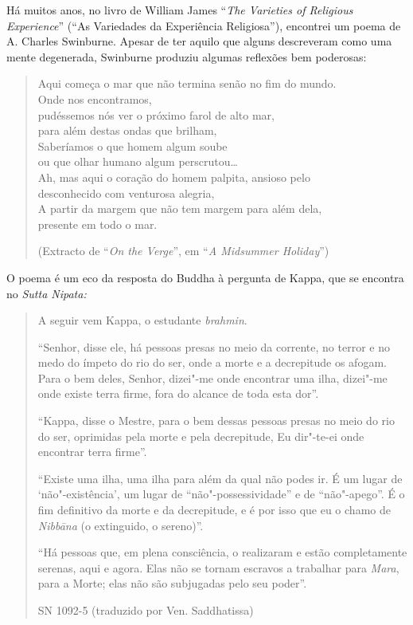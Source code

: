 Há muitos anos, no livro de William James ``\emph{The Varieties of
Religious Experience}'' (``As Variedades da Experiência
Religiosa''), encontrei um poema de A. Charles Swinburne. Apesar de ter
aquilo que alguns descreveram como uma mente degenerada, Swinburne
produziu algumas reflexões bem poderosas:

\begin{quote}
Aqui começa o mar que não termina senão no fim do mundo.\\
Onde nos encontramos,\\
pudéssemos nós ver o próximo farol de alto mar,\\
para além destas ondas que brilham,\\
Saberíamos o que homem algum soube\\
ou que olhar humano algum perscrutou\ldots{}\\
Ah, mas aqui o coração do homem palpita, ansioso pelo\\
desconhecido com venturosa alegria,\\
A partir da margem que não tem margem para além dela,\\
presente em todo o mar.

(Extracto de ``\emph{On the Verge}'', em ``\emph{A Midsummer Holiday}'')
\end{quote}

O poema é um eco da resposta do Buddha à pergunta de Kappa, que se
encontra no \emph{Sutta Nipata:}

\begin{quote}
A seguir vem Kappa, o estudante \emph{brahmin}.

``Senhor, disse ele, há pessoas presas no meio da corrente, no terror e
no medo do ímpeto do rio do ser, onde a morte e a decrepitude os afogam.
Para o bem deles, Senhor, dizei"-me onde encontrar uma ilha, dizei"-me
onde existe terra firme, fora do alcance de toda esta dor''.

``Kappa, disse o Mestre, para o bem dessas pessoas presas no meio do rio
do ser, oprimidas pela morte e pela decrepitude, Eu dir"-te-ei onde
encontrar terra firme''.

``Existe uma ilha, uma ilha para além da qual não podes ir. É um lugar
de `não"-existência', um lugar de ``não"-possessividade'' e de
``não"-apego''. É o fim definitivo da morte e da decrepitude, e é por
isso que eu o chamo de \emph{Nibbāna} (o extinguido, o sereno)''.

``Há pessoas que, em plena consciência, o realizaram e estão
completamente serenas, aqui e agora. Elas não se tornam escravos a
trabalhar para \emph{Mara}, para a Morte; elas não são subjugadas pelo
seu poder''.

SN 1092-5 (traduzido por Ven. Saddhatissa)
\end{quote}

